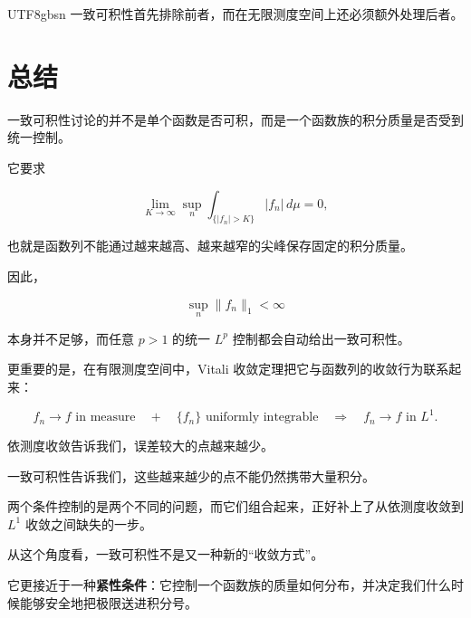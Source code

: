 \documentclass[11pt]{article}
\begin{document}
\begin{CJK*}{UTF8}{gbsn}
一致可积性首先排除前者，而在无限测度空间上还必须额外处理后者。


\section*{总结}


一致可积性讨论的并不是单个函数是否可积，而是一个函数族的积分质量是否受到统一控制。

它要求

\[
\lim_{K\to\infty}
\sup_n
\int_{\{|f_n|>K\}}
|f_n|\,d\mu
=
0,
\]

也就是函数列不能通过越来越高、越来越窄的尖峰保存固定的积分质量。

因此，

\[
\sup_n\|f_n\|_1<\infty
\]

本身并不足够，而任意 $p>1$ 的统一 $L^p$ 控制都会自动给出一致可积性。

更重要的是，在有限测度空间中，Vitali 收敛定理把它与函数列的收敛行为联系起来：

\[
\boxed{
f_n\to f\text{ in measure}
\quad+\quad
\{f_n\}\text{ uniformly integrable}
\quad\Longrightarrow\quad
f_n\to f\text{ in }L^1.
}
\]

依测度收敛告诉我们，误差较大的点越来越少。

一致可积性告诉我们，这些越来越少的点不能仍然携带大量积分。

两个条件控制的是两个不同的问题，而它们组合起来，正好补上了从依测度收敛到 $L^1$ 收敛之间缺失的一步。

从这个角度看，一致可积性不是又一种新的“收敛方式”。

它更接近于一种\textbf{紧性条件}：它控制一个函数族的质量如何分布，并决定我们什么时候能够安全地把极限送进积分号。

\end{CJK*}
\end{document}
